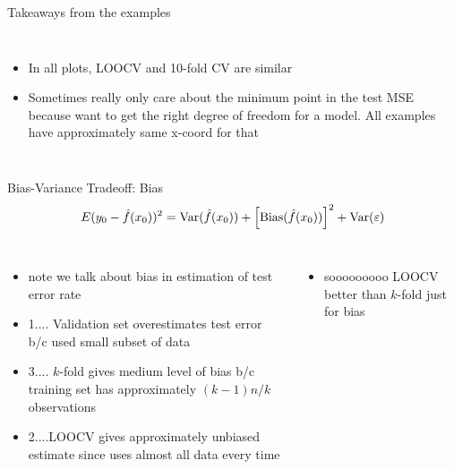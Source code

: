 \documentclass[aspectratio=169,usenames,dvipsnames]{beamer}
\newcommand{\InstructorList}[1]{
\begin{itemize}
	\color{orange}
	#1
\end{itemize}
}
\begin{document}
\begin{frame}[c]{Takeaways from the examples}

\begin{columns}
\centering
\InstructorList{
\item In all plots, LOOCV and 10-fold CV are similar
\item Sometimes really only care about the minimum point in the test MSE because want to get the right degree of freedom for a model. All examples have approximately same x-coord for that

}
\centering

\end{columns}

\end{frame}
\begin{frame}[t]{Bias-Variance Tradeoff: Bias}
	\begin{equation*}
		E(y_0 - \hat f (x_0))^2 = \mathrm{Var}(\hat f (x_0))
			+ \left[\mathrm{Bias}(\hat f(x_0)) \right] ^2
			+ \mathrm{Var}(\varepsilon)
	\end{equation*}
\begin{columns}
\centering
\InstructorList{
\item note we talk about bias in estimation of test error rate
\item 1.... Validation set overestimates test error b/c used small subset of data
\item 3.... $k$-fold gives medium level of bias b/c training set has approximately $(k-1)n/k$ observations
\item 2....LOOCV gives approximately unbiased estimate since uses almost all data every time
}
\centering
\InstructorList{
\item sooooooooo LOOCV better than $k$-fold just for bias
}
\end{columns}

\end{frame}
\end{document}
